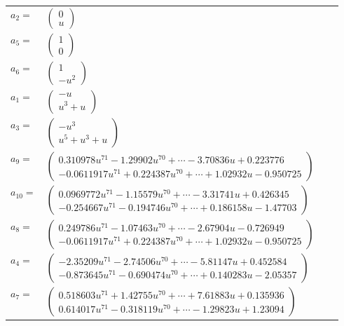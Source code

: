 \documentclass[1p]{elsarticle_modified}
\theoremstyle{definition}
\begin{document}
\begin{tabular}{m{7pt} m{180pt} m{7pt} m{180pt} }
\flushright $a_{2}=$&$\begin{pmatrix}0\\u\end{pmatrix}$ \\
\flushright $a_{5}=$&$\begin{pmatrix}1\\0\end{pmatrix}$ \\
\flushright $a_{6}=$&$\begin{pmatrix}1\\- u^2\end{pmatrix}$ \\
\flushright $a_{1}=$&$\begin{pmatrix}- u\\u^3+u\end{pmatrix}$ \\
\flushright $a_{3}=$&$\begin{pmatrix}- u^3\\u^5+u^3+u\end{pmatrix}$ \\
\flushright $a_{9}=$&$\begin{pmatrix}0.310978 u^{71}-1.29902 u^{70}+\cdots-3.70836 u+0.223776\\-0.0611917 u^{71}+0.224387 u^{70}+\cdots+1.02932 u-0.950725\end{pmatrix}$ \\
\flushright $a_{10}=$&$\begin{pmatrix}0.0969772 u^{71}-1.15579 u^{70}+\cdots-3.31741 u+0.426345\\-0.254667 u^{71}-0.194746 u^{70}+\cdots+0.186158 u-1.47703\end{pmatrix}$ \\
\flushright $a_{8}=$&$\begin{pmatrix}0.249786 u^{71}-1.07463 u^{70}+\cdots-2.67904 u-0.726949\\-0.0611917 u^{71}+0.224387 u^{70}+\cdots+1.02932 u-0.950725\end{pmatrix}$ \\
\flushright $a_{4}=$&$\begin{pmatrix}-2.35209 u^{71}-2.74506 u^{70}+\cdots-5.81147 u+0.452584\\-0.873645 u^{71}-0.690474 u^{70}+\cdots+0.140283 u-2.05357\end{pmatrix}$ \\
\flushright $a_{7}=$&$\begin{pmatrix}0.518603 u^{71}+1.42755 u^{70}+\cdots+7.61883 u+0.135936\\0.614017 u^{71}-0.318119 u^{70}+\cdots-1.29823 u+1.23094\end{pmatrix}$ \\

\end{tabular}
\end{document}
